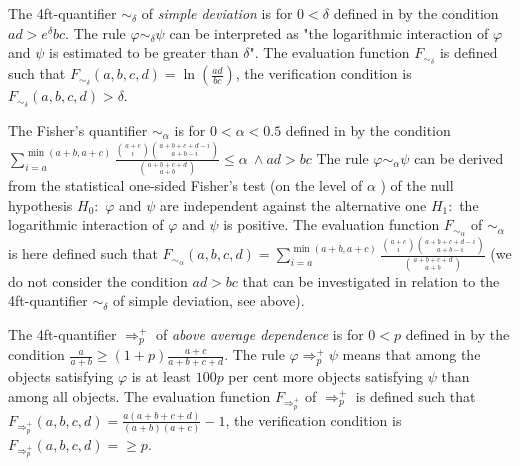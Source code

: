 The 4ft-quantifier 
$ \sim_{\delta} $ of {\it simple deviation \/} 
is for $ 0 < \delta $ defined in \cite{Ha:78} 
by the condition $ ad > e^{\delta}bc $.
The rule $\varphi \sim_{\delta}  \psi $  
can be interpreted as "the logarithmic interaction of $\varphi $ 
and $ \psi $ is estimated to be greater than $\delta$". 
The evaluation function $ F_{\sim_{\delta}}$
 is defined such that 
$ F_{\sim_{\delta}}(a,b,c,d) =  \ln(\frac{ad}{bc}) $, 
the verification condition is $ F_{\sim_{\delta}}(a,b,c,d) > \delta$.

The Fisher's quantifier $ \sim_{\alpha} $ is 
 for $ 0 < \alpha < 0.5$ defined in \cite{Ha:78} by the condition
$  \sum_{i = a}^{\min(a+b,a+c)} \frac{ {a+c \choose i} {a+b+c+d - i \choose a+b - i} }
                               {{a+b+c+d \choose a+b }}  \leq \alpha \  \land ad > bc $
The rule $\varphi \sim_{\alpha}  \psi $ 
can be derived from the statistical one-sided Fisher's 
 test (on the level of $ \alpha$ ) of the null hypothesis  
$H_{0}:$  $\varphi$  and $\psi $ are independent 
 against the  alternative  one  $H_{1}: $ 
 the logarithmic interaction of $\varphi$  and $\psi $ is positive. 
The evaluation function $ F_{\sim_{\alpha}}$
of $\sim_{\alpha}$ is here defined such that 
$ F_{\sim_{\alpha}}(a,b,c,d) =  \sum_{i = a}^{\min(a+b,a+c)} \frac{ {a+c \choose i} {a+b+c+d - i \choose a+b - i} }
                               {{a+b+c+d \choose a+b }}    $  
(we do not consider the condition $ad > bc$ that can be investigated in relation to 
the 4ft-quantifier $ \sim_{\delta} $ of simple deviation, see above).  



The 4ft-quantifier 
$ \Rightarrow^{+}_{p} $ of {\it above average dependence \/} 
is for $ 0 < p $ defined  
in \cite{RS:05A} by the condition
$ \frac{a}{a+b} \geq (1+p) \frac{a+c}{a+b+c+d} $.
The rule $\varphi \Rightarrow^{+}_{p}  \psi $  
means that among the objects satisfying $\varphi$ is at least
$100p$ per cent more objects satisfying $\psi$ than among all
objects. 
The evaluation function $ F_{\Rightarrow^{+}_{p}}$
of $\Rightarrow^{+}_{p}$ is defined such that 
$ F_{\Rightarrow^{+}_{p}}(a,b,c,d) =  \frac{ a(a+b+c+d)} {(a+b)(a+c)} - 1$, 
the verification condition is $ F_{\Rightarrow^{+}_{p}}(a,b,c,d) =  \geq p$.


